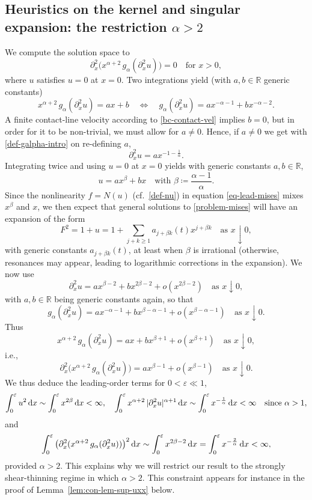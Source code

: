 \documentclass[reqno,12pt]{amsart}
\renewcommand{\d}{\ensuremath{\mathrm{d}}}
\newcommand{\R}{\ensuremath{\mathbb{R}}}
\newcommand{\eps}{\ensuremath{\varepsilon}}
\renewcommand{\d}{\ensuremath{{\rm d}}}
\numberwithin{equation}{section}
\begin{document}
\subsection{Heuristics on the kernel and singular expansion: the restriction $\alpha > 2$}
%
\label{sec:kernel}
We compute the solution space to
%
\[
\partial_x^2 \big(x^{\alpha+2} \, g_\alpha(\partial_x^2 u)\big) = 0 \quad \text{for } x > 0,
\]
%
where $u$ satisfies $u = 0$ at $x = 0$. Two integrations yield (with $a, b \in \R$ generic constants)
%
\[
x^{\alpha+2} \, g_\alpha(\partial_x^2 u) = a x + b \quad \Longleftrightarrow \quad g_\alpha(\partial_x^2 u) = a x^{-\alpha-1} + b x^{-\alpha-2}.
\]
%
A finite contact-line velocity according to \eqref{bc-contact-vel} implies $b = 0$, but in order for it to be non-trivial, we must allow for $a \ne 0$. Hence, if $a \ne 0$ we get with \eqref{def-galpha-intro} on re-defining $a$,
%
\[
\partial_x^2 u = a x^{-1-\frac 1 \alpha}.
\]
%
Integrating twice and using $u = 0$ at $x = 0$ yields with generic constants $a,b \in \R$,
%
\[
u =  a x^\beta + b x \quad \text{with } \beta \coloneqq \frac{\alpha-1}{\alpha}.
\]
%
Since the nonlinearity $f = N(u)$ (cf.~\eqref{def-nu}) in equation \eqref{eq-lead-mises} mixes $x^\beta$ and $x$, we then expect that general solutions to \eqref{problem-mises} will have an expansion of the form
%
\[
F^2 = 1 + u = 1 + \sum_{j + k \ge 1} a_{j+\beta k}(t) x^{j+\beta k} \quad \text{as } x \downarrow 0,
\]
%
with generic constants $a_{j+\beta k}(t)$, at least when $\beta$ is irrational (otherwise, resonances may appear, leading to logarithmic corrections in the expansion). We now use
%
\[
\partial_x^2 u = a x^{\beta-2} + b x^{2\beta-2} + o(x^{2\beta-2}) \quad \text{as } x \downarrow 0,
\]
%
with $a,b \in \R$ being generic constants again,
so that
%
\[
g_\alpha(\partial_x^2 u) = a x^{-\alpha-1} + b x^{\beta-\alpha-1} + o(x^{\beta-\alpha-1}) \quad \text{as } x \downarrow 0.
\]
%
Thus
%
\[
x^{\alpha+2} \, g_\alpha(\partial_x^2 u) = a x + b x^{\beta+1} + o(x^{\beta+1}) \quad \text{as } x \downarrow 0,
\]
%
i.e.,
%
\[
\partial_x^2 \big(x^{\alpha+2} \, g_\alpha(\partial_x^2 u)\big) = a x^{\beta-1} + o(x^{\beta-1}) \quad \text{as } x \downarrow 0.
\]
%
We thus deduce the leading-order terms for $0 < \eps \ll 1$,
%
\[
\int_0^\eps u^2 \, \d x \sim \int_0^\eps x^{2\beta} \, \d x < \infty, \quad \int_0^\eps x^{\alpha+2} \, |\partial_x^2 u|^{\alpha+1} \, \d x \sim \int_0^\eps x^{- \frac 1 \alpha} \, \d x < \infty \quad \text{since } \alpha > 1,
\]
%
and
%
\[
\int_0^\eps \big(\partial_x^2 (x^{\alpha+2} \, g_\alpha(\partial_x^2 u))\big)^2 \, \d x \sim \int_0^\eps x^{2\beta-2} \, \d x = \int_0^\eps x^{-\frac 2 \alpha} \, \d x < \infty,
\]
%
provided $\alpha > 2$. This explains why we will restrict our result to the strongly shear-thinning regime in which $\alpha > 2$. This constraint appears for instance in the proof of Lemma~\ref{lem:con-lem-sup-uxx} below.
\end{document}
